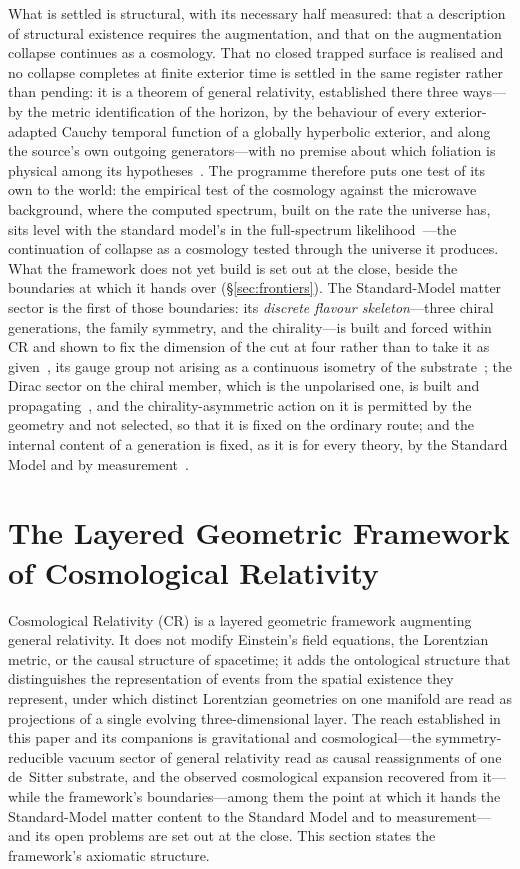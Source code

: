 \documentclass[11pt,a4paper]{article}
\theoremstyle{plain}
\theoremstyle{definition}
\theoremstyle{remark}
\begin{document}
What is settled is structural, with its necessary half measured: that a description of structural existence requires the augmentation, and that on the augmentation collapse continues as a cosmology. That no closed trapped surface is realised and no collapse completes at finite exterior time is settled in the same register rather than pending: it is a theorem of general relativity, established there three ways---by the metric identification of the horizon, by the behaviour of every exterior-adapted Cauchy temporal function of a globally hyperbolic exterior, and along the source's own outgoing generators---with no premise about which foliation is physical among its hypotheses~\cite{JanzenBHcausality}. The programme therefore puts one test of its own to the world: the empirical test of the cosmology against the microwave background, where the computed spectrum, built on the rate the universe has, sits level with the standard model's in the full-spectrum likelihood~\cite{JanzenCRcosmology}---the continuation of collapse as a cosmology tested through the universe it produces. What the framework does not yet build is set out at the close, beside the boundaries at which it hands over (\S\ref{sec:frontiers}). The Standard-Model matter sector is the first of those boundaries: its \emph{discrete flavour skeleton}---three chiral generations, the family symmetry, and the chirality---is built and forced within CR and shown to fix the dimension of the cut at four rather than to take it as given~\cite{JanzenMatter}, its gauge group not arising as a continuous isometry of the substrate~\cite{JanzenBoundary}; the Dirac sector on the chiral member, which is the unpolarised one, is built and propagating~\cite{JanzenDynamics}, and the chirality-asymmetric action on it is permitted by the geometry and not selected, so that it is fixed on the ordinary route; and the internal content of a generation is fixed, as it is for every theory, by the Standard Model and by measurement~\cite{JanzenMatter}.

\section{The Layered Geometric Framework of Cosmological Relativity}\label{sec:CR-axioms}

Cosmological Relativity (CR) is a layered geometric framework augmenting general relativity. It does not modify Einstein's field equations, the Lorentzian metric, or the causal structure of spacetime; it adds the ontological structure that distinguishes the representation of events from the spatial existence they represent, under which distinct Lorentzian geometries on one manifold are read as projections of a single evolving three-dimensional layer. The reach established in this paper and its companions is gravitational and cosmological---the symmetry-reducible vacuum sector of general relativity read as causal reassignments of one de~Sitter substrate, and the observed cosmological expansion recovered from it---while the framework's boundaries---among them the point at which it hands the Standard-Model matter content to the Standard Model and to measurement---and its open problems are set out at the close. This section states the framework's axiomatic structure.
\end{document}
